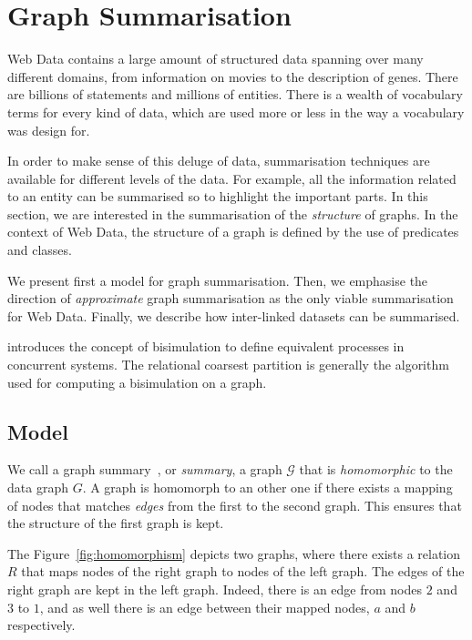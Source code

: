 \section{Graph Summarisation}
\label{chap:summary:model}

Web Data contains a large amount of structured data spanning over many different domains, from information on movies to the description of genes. There are billions of statements and millions of entities. There is a wealth of vocabulary terms for every kind of data, which are used more or less in the way a vocabulary was design for.

In order to make sense of this deluge of data, summarisation techniques are available for different levels of the data. For example, all the information related to an entity can be summarised so to highlight the important parts. In this section, we are interested in the summarisation of the \emph{structure} of graphs. In the context of Web Data, the structure of a graph is defined by the use of predicates and classes.

We present first a model for graph summarisation. Then, we emphasise the direction of \emph{approximate} graph summarisation as the only viable summarisation for Web Data. Finally, we describe how inter-linked datasets can be summarised.

\cite{Milner:1989:CC:534666} introduces the concept of bisimulation to define equivalent processes in concurrent systems. The relational coarsest partition \cite{Paige:1987:TPR:37185.37186} is generally the algorithm used for computing a bisimulation on a graph.

\subsection{Model}

We call a graph summary~\cite{campinas:2012:dexa}, or \emph{summary}, a graph $\mathcal{G}$ that is \emph{homomorphic} to the data graph $G$. A graph is homomorph to an other one if there exists a mapping of nodes that matches \emph{edges} from the first to the second graph. This ensures that the structure of the first graph is kept.

The Figure~\ref{fig:homomorphism} depicts two graphs, where there exists a relation $R$ that maps nodes of the right graph to nodes of the left graph. The edges of the right graph are kept in the left graph. Indeed, there is an edge from nodes $2$ and $3$ to $1$, and as well there is an edge between their mapped nodes, $a$ and $b$ respectively.\\

